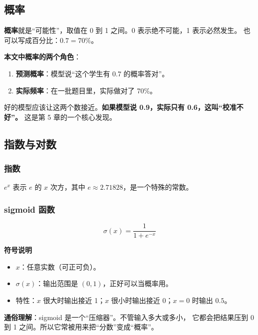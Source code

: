 \documentclass[UTF8,a4paper,11pt]{ctexart}
\newenvironment{explainbox}[1]
{\begin{center}\begin{minipage}{0.94\textwidth}\colorbox{boxbg}{\parbox{0.92\textwidth}{\textbf{#1}\par\vspace{2pt}}}}
{\end{minipage}\end{center}}
\newcommand{\term}[1]{\textbf{#1}}
\newcommand{\hl}[1]{\textcolor{blue!70!black}{\textbf{#1}}}
\begin{document}
\subsection{概率}

\term{概率}就是“可能性”，取值在 0 到 1 之间。0 表示绝不可能，1 表示必然发生。
也可以写成百分比：$0.7 = 70\%$。

\textbf{本文中概率的两个角色}：

\begin{enumerate}[leftmargin=1.6em]
\item \textbf{预测概率}：模型说“这个学生有 0.7 的概率答对”。
\item \textbf{实际频率}：在一批题目里，实际做对了 70\%。
\end{enumerate}

好的模型应该让这两个数接近。\hl{如果模型说 0.9，实际只有 0.6，这叫“校准不好”。}
这是第 5 章的一个核心发现。

\subsection{指数与对数}

\subsubsection{指数}

$e^x$ 表示 $e$ 的 $x$ 次方，其中 $e \approx 2.71828$，是一个特殊的常数。

\subsubsection{sigmoid 函数}

\begin{equation}
\sigma(x) = \frac{1}{1 + e^{-x}}
\end{equation}

\begin{explainbox}{符号说明}
\begin{itemize}[leftmargin=1.4em,itemsep=1pt]
\item $x$：任意实数（可正可负）。
\item $\sigma(x)$：输出范围是 $(0,1)$，正好可以当概率用。
\item 特性：$x$ 很大时输出接近 1；$x$ 很小时输出接近 0；$x=0$ 时输出 $0.5$。
\end{itemize}
\end{explainbox}

\textbf{通俗理解}：sigmoid 是一个“压缩器”。不管输入多大或多小，
它都会把结果压到 0 到 1 之间。所以它常被用来把“分数”变成“概率”。
\end{document}
